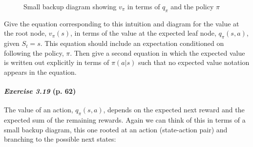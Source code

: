 \documentclass[10pt,a4paper]{article}
\begin{document}
\begin{figure}[h]
\centering
{}
\caption{Small backup diagram showing $v_\pi$ in terms of $q_\pi$ and the policy $\pi$}
\label{relation_state_value_action_value}
\end{figure}


Give the equation corresponding to this intuition and diagram for the value at the root node, $v_\pi(s)$, in terms of the value at the expected leaf node, $q_\pi(s, a)$, given $S_t = s$. This equation should include an expectation conditioned on following the policy, $\pi$. Then give
a second equation in which the expected value is written out explicitly in terms of $\pi(a|s)$ such that no expected value notation appears in the equation.

\clearpage
\paragraph{\textit{Exercise 3.19} (p. 62)} The value of an action, $q_\pi(s, a)$, depends on the expected next reward and
the expected sum of the remaining rewards. Again we can think of this in terms of a
small backup diagram, this one rooted at an action (state-action pair) and branching to
the possible next states:
\end{document}
